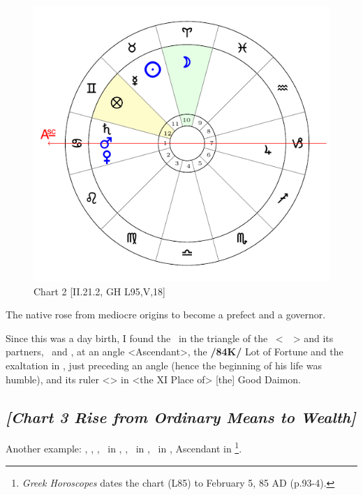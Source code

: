 \clearpage
\begin{figure}
\centering

\includegraphics[width=.68\textwidth]{charts/2_21_2}
\caption{Chart 2 [II.21.2, GH L95,V,18]}
\label{fig:chart02}
\end{figure}

The native rose from mediocre origins to become a prefect and a governor. 

Since this was a day birth, I found the \Sun\, in the triangle of the \Moon\, <\Taurus\, \Virgo\, \Capricorn> and its partners, \Venus\, and \Mars, at an angle <Ascendant>, the \textbf{/84K/} Lot of Fortune and the exaltation in \Gemini, just preceding an angle (hence the beginning of his life was humble), and its ruler <\Mercury> in <the XI Place of> [the] Good Daimon.
\newpage

\subsection*{\textit{[Chart 3 Rise from Ordinary Means to Wealth]}}

Another example: \Sun, \Mars, \Venus, \Mercury\, in \Aquarius, \Moon, \Jupiter\, in \Scorpio, \Saturn\, in \Aries, Ascendant in \Leo
\footnote{\textit{Greek Horoscopes} dates the chart (L85) to February 5, 85 AD (p.93-4).}.

